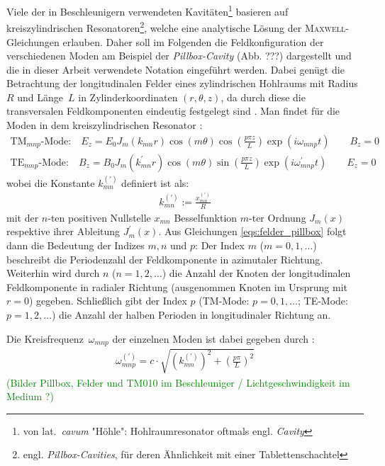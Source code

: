 \documentclass[11pt, a4paper]{scrbook}
\newcommand{\todo}[1]{{\textcolor{Green}{(#1)}}}
\begin{document}
	Viele der in Beschleunigern verwendeten Kavitäten\footnote{von lat.\ \emph{cavum} "Höhle": Hohlraumresonator oftmals engl. \emph{Cavity}} basieren auf kreiszylindrischen Resonatoren\footnote{engl. \emph{Pillbox-Cavities}, für deren Ähnlichkeit mit einer Tablettenschachtel}, welche eine analytische Lösung der \textsc{Maxwell}-Gleichungen erlauben.
	Daher soll im Folgenden die Feldkonfiguration der verschiedenen Moden am Beispiel der \emph{Pillbox-Cavity} (Abb. ???) dargestellt und die in dieser Arbeit verwendete Notation eingeführt werden.
	Dabei genügt die Betrachtung der longitudinalen Felder eines zylindrischen Hohlraums mit Radius~$R$ und Länge~$L$ in Zylinderkoordinaten $(r, \theta, z)$, da durch diese die transversalen Feldkomponenten eindeutig festgelegt sind \cite{hillert}.
	Man findet für die Moden in dem kreiszylindrischen Resonator \cite{wangler}:
	\begin{subequations}
		\begin{align}
		\mathrm{TM}_{mnp}\text{-Mode:} \quad E_z = E_0 J_m(k_{mn} r) \cos(m \theta) \cos\left(\frac{p \pi z}{L}\right) \exp(i \omega_{mnp} t) \qquad B_z = 0\\
		\mathrm{TE}_{mnp}\text{-Mode:} \quad B_z = B_0 J_m(k_{mn}^\prime r) \cos(m \theta) \sin\left(\frac{p \pi z}{L}\right) \exp(i \omega_{mnp}^\prime t) \qquad  E_z = 0
		\end{align}
		\label{eqs:felder_pillbox}
	\end{subequations}
	wobei die Konstante $k_{mn}^{(\prime)}$ definiert ist als:
	\begin{align}
	k_{mn}^{(\prime)} := \frac{x_{mn}^{(\prime)}}{R}
	\end{align}
	mit der $n$-ten positiven Nullstelle $x_{mn}$ Besselfunktion $m$-ter Ordnung $J_m(x)$ respektive ihrer Ableitung $J_m^\prime(x)$.
	Aus Gleichungen \eqref{eqs:felder_pillbox} folgt dann die Bedeutung der Indizes $m, n$ und $p$:
	Der Index $m$ ($m=0, 1, \dots$) beschreibt die Periodenzahl der Feldkomponente in azimutaler Richtung.
	Weiterhin wird durch $n$ ($n=1, 2, \dots$) die Anzahl der Knoten der longitudinalen Feldkomponente in radialer Richtung (ausgenommen Knoten im Ursprung mit $r=0$) gegeben.
	Schließlich gibt der Index $p$ (TM-Mode: $p= 0, 1, \dots$; TE-Mode: $p = 1, 2, \dots$) die Anzahl der halben Perioden in longitudinaler Richtung an.
	
	Die Kreisfrequenz~$\omega_{mnp}$ der einzelnen Moden ist dabei gegeben durch \cite{wangler}:
	\begin{align}
	\omega_{mnp}^{(\prime)} = c \cdot \sqrt{\left( k_{mn}^{(\prime)}\right)^2 + \left( \frac{p \pi}{L} \right)^2}
	\end{align}
	\todo{Bilder Pillbox, Felder und TM010 im Beschleuniger / Lichtgeschwindigkeit im Medium ?}
	
\end{document}
